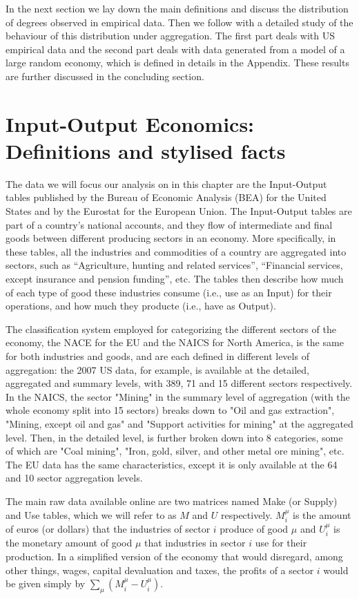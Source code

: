 In the next section we lay down the main definitions and discuss the
distribution of degrees observed in empirical data.  Then we follow
with a detailed study of the behaviour of this distribution under
aggregation. The first part deals with US empirical data and the
second part deals with data generated from a model of a large random
economy, which is defined in details in the Appendix.  These results
are further discussed in the concluding section.

\section{Input-Output Economics: Definitions and stylised facts}
\label{sec:IO}

The data we will focus our analysis on in this chapter are the Input-Output tables published by
the Bureau of Economic Analysis (BEA) for the United States and by the
Eurostat for the European Union. The Input-Output tables are part of a country's national accounts, and they flow of intermediate and final goods between different producing sectors in an economy. More specifically, in these tables, all the industries
and commodities of a country are aggregated into sectors, such as
``Agriculture, hunting and related services'', ``Financial services,
except insurance and pension funding'', etc. The tables then describe how much of each type of good these industries consume (i.e., use as an Input) for their operations, and how much they producte (i.e., have as Output). 

The classification system employed for categorizing the different sectors of the economy, the NACE for the EU and the NAICS for North America, is the
same for both industries and goods, and are each defined in different levels of
aggregation: the 2007 US data, for example, is available at the
detailed, aggregated and summary levels, with 389, 71 and 15 different
sectors respectively. In the NAICS, the sector "Mining" in the summary level of aggregation (with the whole economy split into 15 sectors) breaks down to "Oil and gas extraction", "Mining, except oil and gas" and "Support activities for mining" at the aggregated level. Then, in the detailed level, is further broken down into 8 categories, some of which are "Coal mining", "Iron, gold, silver, and other metal ore mining", etc. The EU data has the same characteristics, except it is only available at the 64 and 10 sector aggregation levels.

The main raw data available online \cite{bea_data, eurostate_data} are two matrices named Make (or Supply) and Use tables,
which we will refer to as $M$ and $U$ respectively. $M_i^\mu$ is the
amount of euros (or dollars) that the industries of sector $i$ produce
of good $\mu$ and $U_i^\mu$ is the monetary amount of good $\mu$ that
industries in sector $i$ use for their production. In a simplified version of the
economy that would disregard, among other things, wages, capital
devaluation and taxes, the profits of a sector $i$ would be given
simply by $\sum_\mu (M_i^\mu - U_i^\mu)$.

